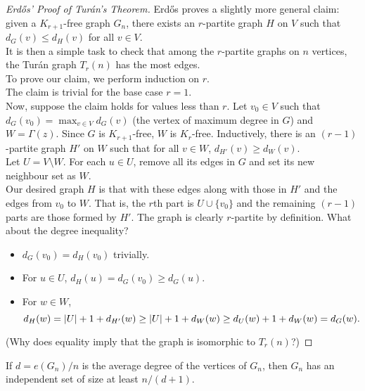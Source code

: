 		\begin{proof}[Erd\H{o}s' Proof of Tur\'{a}n's Theorem]
			Erd\H{o}s proves a slightly more general claim: given a $K_{r+1}$-free graph $G_n$, there exists an $r$-partite graph $H$ on $V$ such that $d_G(v) \le d_H(v)$ for all $v \in V$.\\
			It is then a simple task to check that among the $r$-partite graphs on $n$ vertices, the Tur\'{a}n graph $T_r(n)$ has the most edges.\\

			To prove our claim, we perform induction on $r$.\\
			The claim is trivial for the base case $r=1$.\\
			Now, suppose the claim holds for values less than $r$. Let $v_0 \in V$ such that $d_G(v_0) = \max_{v \in V} d_G(v)$ (the vertex of maximum degree in $G$) and $W = \Gamma(z)$. Since $G$ is $K_{r+1}$-free, $W$ is $K_r$-free. Inductively, there is an $(r-1)$-partite graph $H'$ on $W$ such that for all $v \in W$, $d_{H'}(v) \ge d_W(v)$.\\
			Let $U = V \setminus W$. For each $u \in U$, remove all its edges in $G$ and set its new neighbour set as $W$.\\
			Our desired graph $H$ is that with these edges along with those in $H'$ and the edges from $v_0$ to $W$. That is, the $r$th part is $U \cup \{v_0\}$ and the remaining $(r-1)$ parts are those formed by $H'$. The graph is clearly $r$-partite by definition. What about the degree inequality?
			\begin{itemize}
				\item $d_G(v_0) = d_H(v_0)$ trivially.
				\item For $u \in U$, $d_H(u) = d_G(v_0) \ge d_G(u)$.
				\item For $w \in W$,
				\[ d_H(w) = |U| + 1 + d_{H'}(w) \ge |U| + 1 + d_W(w) \ge d_U(w) + 1 + d_W(w) = d_G(w). \qedhere \]
			\end{itemize}

			(Why does equality imply that the graph is isomorphic to $T_r(n)$?)
		\end{proof}

		\begin{ftheo}
			If $d = e(G_n) / n$ is the average degree of the vertices of $G_n$, then $G_n$ has an independent set of size at least $n/(d+1)$.
		\end{ftheo}

